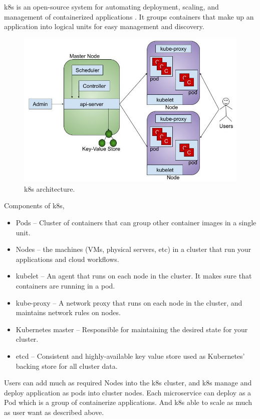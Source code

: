\acrfull{k8s} is an open-source system for automating deployment, scaling, and management of containerized applications \cite{LinuxFoundationProduction-GradeKubernetes}. It groups containers that make up an application into logical units for easy management and discovery.
\begin{figure}[htp]
    \centering
    \includegraphics[width=1\textwidth]{method/microservice/k8s_architecture_v3.jpg}
    \caption{\acrfull{k8s} architecture.}
    \label{fi:k8s_architecture}
\end{figure}
Components of \acrshort{k8s},
\begin{itemize}
    \item Pods -- Cluster of containers that can group other container images in a single unit.
    \item Nodes -- the machines (VMs, physical servers, etc) in a cluster that run your applications and cloud workflows.
    \item kubelet -- An agent that runs on each node in the cluster. It makes sure that containers are running in a pod.
    \item kube-proxy -- A network proxy that runs on each node in the cluster, and maintains network rules on nodes.
    \item Kubernetes master -- Responsible for maintaining the desired state for your cluster.
    \item etcd -- Consistent and highly-available key value store used as Kubernetes’ backing store for all cluster data.
\end{itemize}
Users can add much as required Nodes into the \acrshort{k8s} cluster, and \acrshort{k8s} manage and deploy application as pods into cluster nodes.
Each microservice can deploy as a Pod which is a group of containerize applications. And \acrshort{k8s} able to scale as much as user want as described above.


